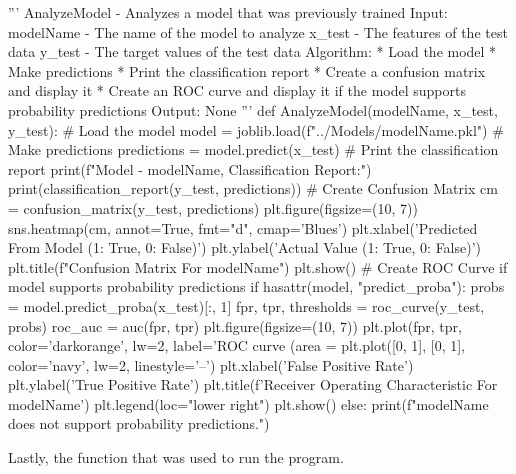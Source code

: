 {\begin{highlight}[Assets]
    \begin{code}[Python]
    ''' AnalyzeModel - Analyzes a model that was previously trained
            Input:
                modelName - The name of the model to analyze
                x_test - The features of the test data
                y_test - The target values of the test data
            Algorithm:
                * Load the model
                * Make predictions
                * Print the classification report
                * Create a confusion matrix and display it
                * Create an ROC curve and display it if the model supports probability predictions
            Output:
                None
    '''
    def AnalyzeModel(modelName, x_test, y_test):
        # Load the model
        model = joblib.load(f"../Models/{modelName}.pkl")
        # Make predictions
        predictions = model.predict(x_test)
        # Print the classification report
        print(f"Model - {modelName}, Classification Report:")
        print(classification_report(y_test, predictions))
        # Create Confusion Matrix
        cm = confusion_matrix(y_test, predictions)
        plt.figure(figsize=(10, 7))
        sns.heatmap(cm, annot=True, fmt="d", cmap='Blues')
        plt.xlabel('Predicted From Model (1: True, 0: False)')
        plt.ylabel('Actual Value (1: True, 0: False)')
        plt.title(f"Confusion Matrix For {modelName}")
        plt.show()
        # Create ROC Curve if model supports probability predictions
        if hasattr(model, "predict_proba"):
            probs = model.predict_proba(x_test)[:, 1]
            fpr, tpr, thresholds = roc_curve(y_test, probs)
            roc_auc = auc(fpr, tpr)
            plt.figure(figsize=(10, 7))
            plt.plot(fpr, tpr, color='darkorange', lw=2, label='ROC curve (area = %
            plt.plot([0, 1], [0, 1], color='navy', lw=2, linestyle='--')
            plt.xlabel('False Positive Rate')
            plt.ylabel('True Positive Rate')
            plt.title(f'Receiver Operating Characteristic For {modelName}')
            plt.legend(loc="lower right")
            plt.show()
        else:
            print(f"{modelName} does not support probability predictions.")        
    \end{code}

        Lastly, the function that was used to run the program.
        

\end{highlight}}
